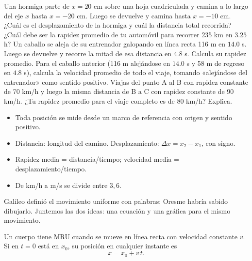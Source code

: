 \documentclass[11pt]{article}
\begin{document}
\begin{preguntas}
\pregunta Una hormiga parte de $x = 20$ cm sobre una hoja cuadriculada y camina a lo largo del
eje $x$ hasta $x = -20$ cm. Luego se devuelve y camina hasta $x = -10$ cm. ¿Cuál es el
desplazamiento de la hormiga y cuál la distancia total recorrida?
\espacio{2.5cm}
\pregunta ¿Cuál debe ser la rapidez promedio de tu automóvil para recorrer 235 km en
$\num{3,25}$ h?
\espacio{2cm}
\pregunta Un caballo se aleja de su entrenador galopando en línea recta 116 m en $\num{14,0}$ s.
Luego se devuelve y recorre la mitad de esa distancia en $\num{4,8}$ s. Calcula su rapidez
promedio.
\espacio{2.5cm}
\pregunta Para el caballo anterior (116 m alejándose en $\num{14,0}$ s y 58 m de regreso en
$\num{4,8}$ s), calcula la velocidad promedio de todo el viaje, tomando «alejándose del
entrenador» como sentido positivo.
\espacio{2.5cm}
\pregunta Viajas del punto A al B con rapidez constante de 70 km/h y luego la misma distancia de
B a C con rapidez constante de 90 km/h. ¿Tu rapidez promedio para el viaje completo es de
80 km/h? Explica.
\end{preguntas}

\begin{resumen}
\begin{itemize}
  \item Toda posición se mide desde un marco de referencia con origen y sentido positivo.
  \item Distancia: longitud del camino. Desplazamiento: $\Delta x = x_2 - x_1$, con signo.
  \item Rapidez media = distancia/tiempo; velocidad media = desplazamiento/tiempo.
  \item De km/h a m/s se divide entre $3{,}6$.
\end{itemize}
\end{resumen}

\label{tema:mru}

\begin{hilo}
Galileo definió el movimiento uniforme con palabras; Oresme habría sabido dibujarlo. Juntemos
las dos ideas: una ecuación y una gráfica para el mismo movimiento.
\end{hilo}

\begin{definicion}
Un cuerpo tiene MRU cuando se mueve en línea recta con velocidad constante $v$. Si en $t = 0$
está en $x_0$, su posición en cualquier instante es
\[
  x = x_0 + v\,t.
\]
\end{definicion}
\end{document}
